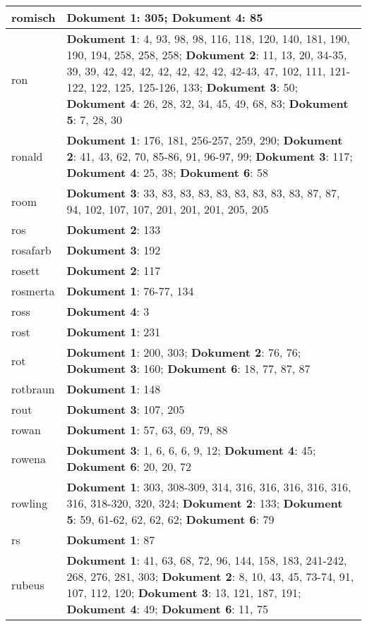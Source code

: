 \documentclass[a5paper]{article}
\begin{document}
\begin{longtable}[l]{|l|p{3in}|}
\hline
romisch & \textbf{Dokument 1}: 305; \textbf{Dokument 4}: 85 \\
\hline
ron & \textbf{Dokument 1}: 4, 93, 98, 98, 116, 118, 120, 140, 181, 190, 190, 194, 258, 258, 258; \textbf{Dokument 2}: 11, 13, 20, 34-35, 39, 39, 42, 42, 42, 42, 42, 42, 42, 42-43, 47, 102, 111, 121-122, 122, 125, 125-126, 133; \textbf{Dokument 3}: 50; \textbf{Dokument 4}: 26, 28, 32, 34, 45, 49, 68, 83; \textbf{Dokument 5}: 7, 28, 30 \\
\hline
ronald & \textbf{Dokument 1}: 176, 181, 256-257, 259, 290; \textbf{Dokument 2}: 41, 43, 62, 70, 85-86, 91, 96-97, 99; \textbf{Dokument 3}: 117; \textbf{Dokument 4}: 25, 38; \textbf{Dokument 6}: 58 \\
\hline
room & \textbf{Dokument 3}: 33, 83, 83, 83, 83, 83, 83, 83, 83, 87, 87, 94, 102, 107, 107, 201, 201, 201, 205, 205 \\
\hline
ros & \textbf{Dokument 2}: 133 \\
\hline
rosafarb & \textbf{Dokument 3}: 192 \\
\hline
rosett & \textbf{Dokument 2}: 117 \\
\hline
rosmerta & \textbf{Dokument 1}: 76-77, 134 \\
\hline
ross & \textbf{Dokument 4}: 3 \\
\hline
rost & \textbf{Dokument 1}: 231 \\
\hline
rot & \textbf{Dokument 1}: 200, 303; \textbf{Dokument 2}: 76, 76; \textbf{Dokument 3}: 160; \textbf{Dokument 6}: 18, 77, 87, 87 \\
\hline
rotbraun & \textbf{Dokument 1}: 148 \\
\hline
rout & \textbf{Dokument 3}: 107, 205 \\
\hline
rowan & \textbf{Dokument 1}: 57, 63, 69, 79, 88 \\
\hline
rowena & \textbf{Dokument 3}: 1, 6, 6, 6, 9, 12; \textbf{Dokument 4}: 45; \textbf{Dokument 6}: 20, 20, 72 \\
\hline
rowling & \textbf{Dokument 1}: 303, 308-309, 314, 316, 316, 316, 316, 316, 316, 318-320, 320, 324; \textbf{Dokument 2}: 133; \textbf{Dokument 5}: 59, 61-62, 62, 62, 62; \textbf{Dokument 6}: 79 \\
\hline
rs & \textbf{Dokument 1}: 87 \\
\hline
rubeus & \textbf{Dokument 1}: 41, 63, 68, 72, 96, 144, 158, 183, 241-242, 268, 276, 281, 303; \textbf{Dokument 2}: 8, 10, 43, 45, 73-74, 91, 107, 112, 120; \textbf{Dokument 3}: 13, 121, 187, 191; \textbf{Dokument 4}: 49; \textbf{Dokument 6}: 11, 75 \\

\end{longtable}
\end{document}
